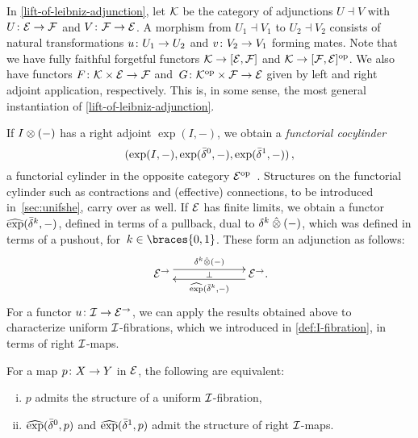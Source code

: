 \documentclass[reqno,10pt,a4paper,oneside,draft]{amsart}
\begin{document}
\begin{remark} \label{pitchfork-leibniz-most-general-example}
In \cref{lift-of-leibniz-adjunction}, let $\cal{K}$ be the category of adjunctions $U \dashv V$ with $U \co \catE \to \cal{F}$ and $V \co \cal{F} \to \catE$.
A morphism from $U_1 \dashv V_1$ to $U_2 \dashv V_2$ consists of natural transformations $u \co U_1 \to U_2$ and $v \co V_2 \to V_1$ forming mates.
Note that we have fully faithful forgetful functors $\cal{K} \to [\catE, \cal{F}]$ and $\cal{K} \to [\cal{F}, \catE]^{\op}$.
We also have functors $F \co \cal{K} \times \catE \to \cal{F}$ and~$G \co \cal{K}^{\op} \times \cal{F} \to \catE$ given by left and right adjoint application, respectively.
This is, in some sense, the most general instantiation of \cref{lift-of-leibniz-adjunction}.
\end{remark}

If $\interval \otimes (-)$ has a right adjoint $\exp(I, -)$, we obtain a \emph{functorial cocylinder} \[
(\exp(\interval, -), \exp(\bar{\delta}^0, -), \exp(\bar{\delta}^1, -)) \, ,
\]
\ie a functorial cylinder in the opposite category $\catE^{\op}$~\cite{kamps-porter:homotopy}.
Structures on the functorial cylinder such as contractions and (effective) connections, to be introduced in~\cref{sec:unifshe}, carry over as well.
If $\calE$ has finite limits, we obtain a functor $\hatexp(\bar{\delta}^k, -)$, defined in terms of a pullback, dual to $\kcyl \hatotimes (-)$, which was defined in terms of a pushout, for~$k \in \braces{0, 1}$.
These form an adjunction as follows:
\[
\xymatrix@C+4em{
  \catE^\to
  \ar@<1ex>[r]^{\kcyl \hatotimes (-)}
  \ar@{}[r]|{\bot}
&
  \catE^\to
  \ar@<1ex>[l]^{\hatexp(\bar{\delta}^k, -)}
\rlap{.}}
\]
For a functor $u \co \cal{I} \to \catE^\to$, we can apply the results obtained above to characterize uniform $\cal{I}$-fibrations, which we introduced in \cref{def:I-fibration}, in terms of right $\cal{I}$-maps.

\begin{proposition} \label{prod-exp-general}
For a map $p \co X \to Y$ in $\catE$, the following are equivalent:
\begin{enumerate}[(i)]
\item $p$ admits the structure of a uniform $\cal{I}$-fibration,
\item $\hatexp(\bar{\delta}^0, p)$ and $\hatexp(\bar{\delta}^1, p)$ admit the structure of right $\cal{I}$-maps.
\end{enumerate}
\end{proposition}
\end{document}
